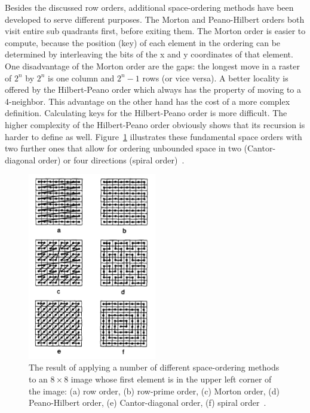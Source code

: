 Besides the discussed row orders, additional space-ordering methods have been developed to serve different purposes. The Morton and Peano-Hilbert orders both visit entire sub quadrants first, before exiting them. The Morton order is easier to compute, because the position (key) of each element in the ordering can be determined by interleaving the bits of the x and y coordinates of that element. One disadvantage of the Morton order are the gaps: the longest move in a raster of $2^n$ by $2^n$ is one column and $2^n - 1$ rows (or vice versa). A better locality is offered by the Hilbert-Peano order which always has the property of moving to a 4-neighbor. This advantage on the other hand has the cost of a more complex definition. Calculating keys for the Hilbert-Peano order is more difficult. The higher complexity of the Hilbert-Peano order obviously shows that its recursion is harder to define as well. Figure~\ref{fig:space-orders} illustrates these fundamental space orders with two further ones that allow for ordering unbounded space in two (Cantor-diagonal order) or four directions (spiral order)~\cite{Samet90spatialdata}.

\begin{figure}[h]
  \begin{center}
    \includegraphics[width=0.5\textwidth]{figures/space_orders.png}
    \caption{The result of applying a number of different space-ordering methods to an $8 \times 8$ image whose first element is in the upper left corner of the image: (a) row order, (b) row-prime order, (c) Morton order, (d) Peano-Hilbert order, (e) Cantor-diagonal order, (f) spiral order~\cite[p 14]{Samet90spatialdata}.}
    \label{fig:space-orders}
  \end{center}
\end{figure}

